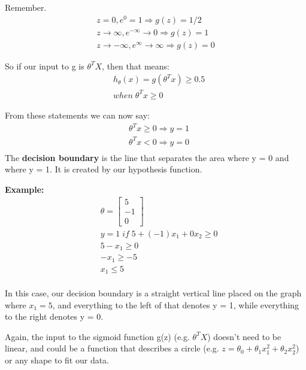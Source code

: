 \documentclass{article}
\begin{document}
Remember.
\begin{align*}
	z=0, e^{0}=1 \Rightarrow g(z)=1/2\\ 
	z \to \infty, e^{-\infty} \to 0 \Rightarrow g(z)=1 \\ 
	z \to -\infty, e^{\infty}\to \infty \Rightarrow g(z)=0 
\end{align*}

So if our input to g is $\theta^T X$, then that means:
\begin{align*}
	& h_\theta(x) = g(\theta^T x) \geq 0.5 \\
	& when \; \theta^T x \geq 0
\end{align*}

From these statements we can now say:
\begin{align*}
	& \theta^T x \geq 0 \Rightarrow y = 1 \\
	& \theta^T x < 0 \Rightarrow y = 0 \\
\end{align*}
The \textbf{decision boundary} is the line that separates the area where y = 0 and where y = 1. It is created by our hypothesis function.

\textbf{Example:}
\begin{align*}
	& \theta = \begin{bmatrix}5 \\ -1 \\ 0\end{bmatrix} \\ 
	& y = 1 \; if \; 5 + (-1) x_1 + 0 x_2 \geq 0 \\ 
	& 5 - x_1 \geq 0 \\ & - x_1 \geq -5 \\
	& x_1 \leq 5 \\ 
\end{align*}

In this case, our decision boundary is a straight vertical line placed on the graph where $x_1 = 5$, and everything to the left of that denotes y = 1, while everything to the right denotes y = 0.

Again, the input to the sigmoid function g(z) (e.g. $\theta^T X$) doesn't need to be linear, and could be a function that describes a circle (e.g. $z = \theta_0 + \theta_1 x_1^2 +\theta_2 x_2^2$) or any shape to fit our data.
\end{document}
